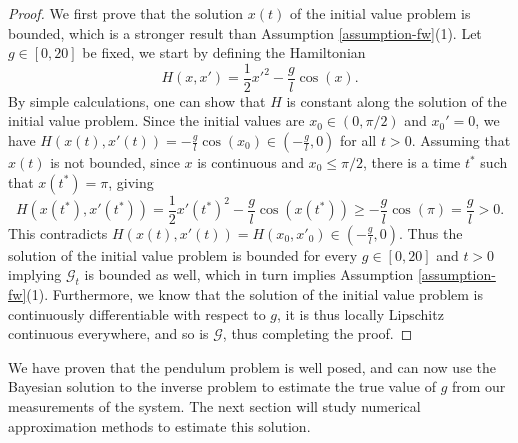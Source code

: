 \begin{proof}
  We first prove that the solution $x(t)$ of the initial value problem is bounded, which is a stronger result than Assumption \ref{assumption-fw}(1). Let $g \in [0, 20]$ be fixed, we start by defining the Hamiltonian
  \begin{equation*}
    H(x, x') = \frac12 x'^2 - \frac{g}{l}\cos(x).
  \end{equation*}
  By simple calculations, one can show that $H$ is constant along the solution of the initial value problem. Since the initial values are $x_0 \in (0, \pi/2)$ and $x_0' = 0$, we have $H(x(t), x'(t)) = -\frac{g}{l}\cos(x_0) \in (-\frac{g}{l}, 0)$ for all $t > 0$. Assuming that $x(t)$ is not bounded, since $x$ is continuous and $x_0 \le \pi/2$, there is a time $t^*$ such that $x(t^*) = \pi$, giving
  \begin{equation*}
    H(x(t^*), x'(t^*)) = \frac12 x'(t^*)^2 - \frac{g}{l}\cos(x(t^*)) \ge -\frac{g}{l}\cos(\pi) = \frac{g}{l} > 0.
  \end{equation*}
  This contradicts $H(x(t), x'(t)) = H(x_0, x'_0) \in (-\frac{g}{l}, 0)$. Thus the solution of the initial value problem is bounded for every $g \in [0, 20]$ and $t > 0$ implying $\mathcal{G}_t$ is bounded as well, which in turn implies Assumption \ref{assumption-fw}(1).
  Furthermore, we know that the solution of the initial value problem is continuously differentiable with respect to $g$, it is thus locally Lipschitz continuous everywhere, and so is $\mathcal{G}$, thus completing the proof.
\end{proof}

We have proven that the pendulum problem is well posed, and can now use the Bayesian solution to the inverse problem to estimate the true value of $g$ from our measurements of the system. The next section will study numerical approximation methods to estimate this solution.

